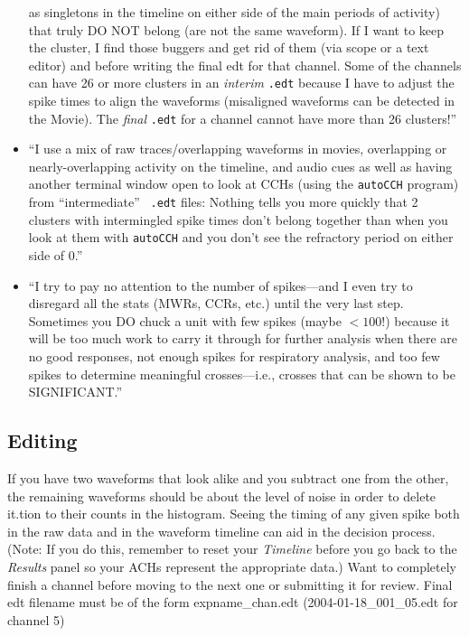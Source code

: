 \documentclass[12pt]{article}
\begin{document}
\begin{itemize}
  as singletons in the timeline on either side of the main periods of
  activity) that truly DO NOT belong (are not the same waveform). If I
  want to keep the cluster, I find those buggers and get rid of them
  (via scope or a text editor) and before writing the final edt for
  that channel. Some of the channels can have 26 or more clusters in
  an \textit{interim} {\tt .edt} because I have to adjust the spike
  times to align the waveforms (misaligned waveforms can be detected
  in the Movie). The \textit{final} {\tt .edt} for a channel cannot
  have more than 26 clusters!''
\item ``I use a mix of raw traces/overlapping waveforms in movies,
  overlapping or nearly-overlapping activity on the timeline, and
  audio cues as well as having another terminal window open to look at
  CCHs (using the {\tt autoCCH} program) from ``intermediate'' {\tt
    .edt} files: Nothing tells you more quickly that 2 clusters with
  intermingled spike times don't belong together than when you look at
  them with {\tt autoCCH} and you don't see the refractory period on
  either side of 0.''
\item ``I try to pay no attention to the number of spikes---and I even
  try to disregard all the stats (MWRs, CCRs, etc.)  until the very
  last step. Sometimes you DO chuck a unit with few spikes (maybe
  $<100$!) because it will be too much work to carry it through for
  further analysis when there are no good responses, not enough spikes
  for respiratory analysis, and too few spikes to determine meaningful
  crosses---i.e., crosses that can be shown to be SIGNIFICANT.''
\end{itemize}

\iffalse
\subsection{ Editing}

{\color{black}
If you have two waveforms that look alike and you subtract one from the other, the remaining waveforms should be about
the level of noise in order to delete it.tion to their counts in the histogram. Seeing the timing of any given spike
both in the raw data and in the waveform timeline can aid in the decision process. (Note: If you do this, remember to
reset your \textit{Timeline }before you go back to the \textit{Results }panel so your ACHs represent the appropriate
data.) Want to completely finish a channel before moving to the next one or submitting it for review. Final edt
filename must be of the form expname\_chan.edt (2004-01-18\_001\_05.edt for channel 5)}
\end{document}
